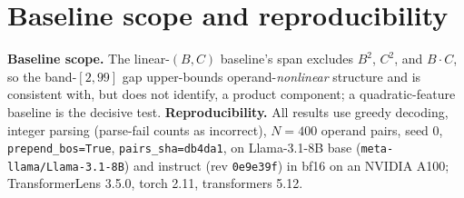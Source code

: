 \section{Baseline scope and reproducibility}
\label{app:repro}
\textbf{Baseline scope.} The linear-$(B,C)$ baseline's span excludes $B^2$, $C^2$, and
$B\!\cdot\!C$, so the band-$[2,99]$ gap upper-bounds operand-\emph{nonlinear} structure and is
consistent with, but does not identify, a product component; a quadratic-feature baseline is the
decisive test. \textbf{Reproducibility.} All results use greedy decoding, integer parsing
(parse-fail counts as incorrect), $N = 400$ operand pairs, seed $0$, \texttt{prepend\_bos=True},
\texttt{pairs\_sha=db4da1}, on Llama-3.1-8B base (\texttt{meta-llama/Llama-3.1-8B}) and instruct
(rev \texttt{0e9e39f}) in bf16 on an NVIDIA A100; TransformerLens 3.5.0, torch 2.11, transformers
5.12.
